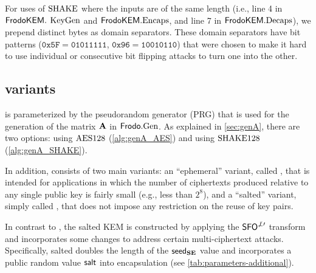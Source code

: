 For uses of $\textrm{\upshape\mdseries SHAKE}$ where the inputs are of the same length (i.e., line 4 in $\textsf{\upshape\mdseries FrodoKEM}.$ $\textrm{\upshape\mdseries KeyGen}$ and $\textsf{\upshape\mdseries FrodoKEM}.\textrm{\upshape\mdseries Encaps}$, and line 7 in $\textsf{\upshape\mdseries FrodoKEM}.\textrm{\upshape\mdseries Decaps}$), we prepend distinct bytes as domain separators.  These domain separators have bit patterns ($\mathtt{0x5F}=\mathtt{01011111}$, $\mathtt{0x96}=\mathtt{10010110}$) that were chosen to make it hard to use individual or consecutive bit flipping attacks to turn one into the other.

\subsection{\FrodoKEM variants}\label{sec:variants}

\FrodoKEM is parameterized by the pseudorandom generator (PRG) that is used for
the generation of the matrix $\mathbf{A}$ in $\textsf{\upshape\mdseries Frodo}.\textrm{\upshape\mdseries Gen}$. As explained in \autoref{sec:genA}, there are two options:
using $\textrm{\upshape\mdseries AES128}$ (\autoref{alg:genA_AES}) and using $\textrm{\upshape\mdseries SHAKE}128$ (\autoref{alg:genA_SHAKE}).

In addition, \FrodoKEM consists of two main variants: an ``ephemeral'' variant, called \eFrodoKEM,
that is intended for applications in which the number of ciphertexts produced
relative to any single public key is fairly small (e.g., less than $2^8$), and a ``salted'' variant, simply called \FrodoKEM, that does
not impose any restriction on the reuse of key pairs.

In contrast to \eFrodoKEM, the salted KEM \FrodoKEM is constructed by applying the $\textsf{\upshape\mdseries SFO}^{\not\perp\prime}$ transform
and incorporates some changes to address certain multi-ciphertext attacks. 
Specifically, salted \FrodoKEM doubles the length of the ${\mathsf{seed}_{\mathbf{S}\mathbf{E}}}$ value
and incorporates a public random value ${\mathsf{salt}}$ into encapsulation (see \autoref{tab:parameters-additional}).

